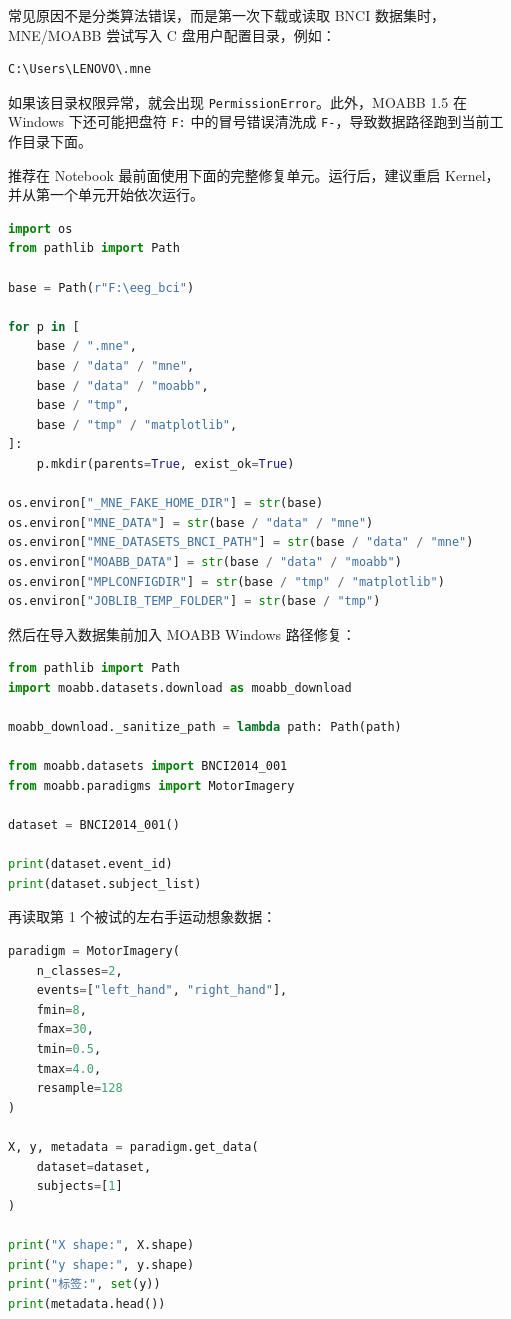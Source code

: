 \documentclass[UTF8,a4paper,12pt]{ctexart}
\begin{document}
常见原因不是分类算法错误，而是第一次下载或读取 BNCI 数据集时，MNE/MOABB 尝试写入 C 盘用户配置目录，例如：

\begin{lstlisting}[language={}]
C:\Users\LENOVO\.mne
\end{lstlisting}

如果该目录权限异常，就会出现 \texttt{PermissionError}。此外，MOABB 1.5 在 Windows 下还可能把盘符 \texttt{F:} 中的冒号错误清洗成 \texttt{F-}，导致数据路径跑到当前工作目录下面。

推荐在 Notebook 最前面使用下面的完整修复单元。运行后，建议重启 Kernel，并从第一个单元开始依次运行。

\begin{lstlisting}[language=Python,caption={修复 MNE/MOABB 数据路径与 Windows 盘符问题}]
import os
from pathlib import Path

base = Path(r"F:\eeg_bci")

for p in [
    base / ".mne",
    base / "data" / "mne",
    base / "data" / "moabb",
    base / "tmp",
    base / "tmp" / "matplotlib",
]:
    p.mkdir(parents=True, exist_ok=True)

os.environ["_MNE_FAKE_HOME_DIR"] = str(base)
os.environ["MNE_DATA"] = str(base / "data" / "mne")
os.environ["MNE_DATASETS_BNCI_PATH"] = str(base / "data" / "mne")
os.environ["MOABB_DATA"] = str(base / "data" / "moabb")
os.environ["MPLCONFIGDIR"] = str(base / "tmp" / "matplotlib")
os.environ["JOBLIB_TEMP_FOLDER"] = str(base / "tmp")
\end{lstlisting}

然后在导入数据集前加入 MOABB Windows 路径修复：

\begin{lstlisting}[language=Python,caption={修复 MOABB 1.5 的 Windows 路径清洗问题}]
from pathlib import Path
import moabb.datasets.download as moabb_download

moabb_download._sanitize_path = lambda path: Path(path)

from moabb.datasets import BNCI2014_001
from moabb.paradigms import MotorImagery

dataset = BNCI2014_001()

print(dataset.event_id)
print(dataset.subject_list)
\end{lstlisting}

再读取第 1 个被试的左右手运动想象数据：

\begin{lstlisting}[language=Python,caption={读取 subject 1 的左右手运动想象数据}]
paradigm = MotorImagery(
    n_classes=2,
    events=["left_hand", "right_hand"],
    fmin=8,
    fmax=30,
    tmin=0.5,
    tmax=4.0,
    resample=128
)

X, y, metadata = paradigm.get_data(
    dataset=dataset,
    subjects=[1]
)

print("X shape:", X.shape)
print("y shape:", y.shape)
print("标签:", set(y))
print(metadata.head())
\end{lstlisting}
\end{document}

